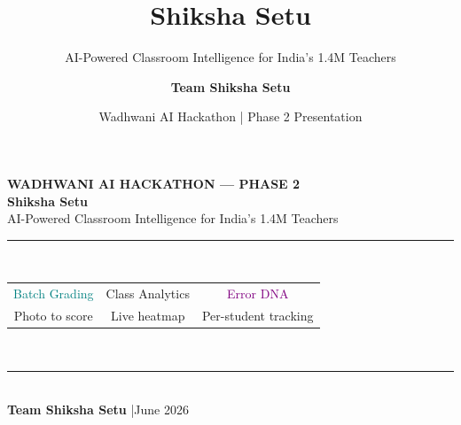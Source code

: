 \documentclass[aspectratio=169,10pt]{beamer}
\title{Shiksha Setu}
\subtitle{AI-Powered Classroom Intelligence for India's 1.4M Teachers}
\author{\textbf{Team Shiksha Setu}}
\date{Wadhwani AI Hackathon \;|\; Phase 2 Presentation}
\begin{document}

\begin{frame}[plain]

\vspace{0.6cm}
\begin{center}

\colorbox{card}{\parbox{0.86\textwidth}{\centering
  \vspace{10pt}
  \textcolor{teallt}{\tiny\bfseries\MakeUppercase{Wadhwani AI Hackathon --- Phase 2}}\\[6pt]
  \textcolor{txt}{\LARGE\textbf{Shiksha Setu}}\\[4pt]
  \textcolor{orng}{\small AI-Powered Classroom Intelligence for India's 1.4M Teachers}\\[8pt]
  \textcolor{cardbdr}{\rule{0.7\textwidth}{0.4pt}}\\[6pt]
  \begin{tabular}{ccc}
    \textcolor{teal}{\small Batch Grading} &
    \textcolor{orng}{\small Class Analytics} &
    \textcolor{purple}{\small Error DNA}\\
    \textcolor{txtsec}{\scriptsize Photo to score} &
    \textcolor{txtsec}{\scriptsize Live heatmap} &
    \textcolor{txtsec}{\scriptsize Per-student tracking}
  \end{tabular}\\[8pt]
  \textcolor{cardbdr}{\rule{0.7\textwidth}{0.4pt}}\\[4pt]
  \textcolor{txtsec}{\footnotesize\textbf{Team Shiksha Setu} \quad|\quad June 2026}\\[8pt]
}}

\end{center}
\end{frame}
\end{document}
